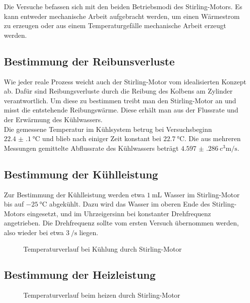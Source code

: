 Die Versuche befassen sich mit den beiden Betriebsmodi des Stirling-Motors. Es kann entweder mechanische Arbeit aufgebracht werden, um einen Wärmestrom zu erzeugen oder aus einem Temperaturgefälle mechanische Arbeit erzeugt werden. 

\subsection{Bestimmung der Reibunsverluste}
Wie jeder reale Prozess weicht auch der Stirling-Motor vom idealisierten Konzept ab. Dafür sind Reibungsverluste durch die Reibung des Kolbens am Zylinder verantwortlich. Um diese zu bestimmen treibt man den Stirling-Motor an und misst die entstehende Reibungswärme. Diese erhält man aus der Flussrate und der Erwärmung des Kühlwassers. \\
Die gemessene Temperatur im Kühlsystem betrug bei Versuchsbeginn $ \SI{22.4(1)}{\degreeCelsius} $ und blieb nach einiger Zeit konstant bei $ \SI{22.7}{\degreeCelsius} $. Die aus mehreren Messungen gemittelte Abflussrate des Kühlwassers beträgt $ \SI{4.597(286)}{\cubic\centi\meter\per\second} $.

\subsection{Bestimmung der Kühlleistung}

Zur Bestimmung der Kühlleistung werden etwa $ \SI{1}{\milli\liter} $ Wasser im Stirling-Motor bis auf $ \SI{-25}{\degreeCelsius} $ abgekühlt. Dazu wird das Wasser im oberen Ende des Stirling-Motors eingesetzt, und im Uhrzeigersinn bei konstanter Drehfrequenz angetrieben. Die Drehfrequenz sollte vom ersten Versuch übernommen werden, also wieder bei etwa $ \SI{3}{\per\second} $ liegen. 

\begin{figure}[h!]
	\centering
	
	\caption{Temperaturverlauf bei Kühlung durch Stirling-Motor}
	\label{fig:a2T}
\end{figure}

\subsection{Bestimmung der Heizleistung}

\begin{figure}[h!]
	\centering
	
	\caption{Temperaturverlauf beim heizen durch Stirling-Motor}
	\label{fig:a3T}
\end{figure}

